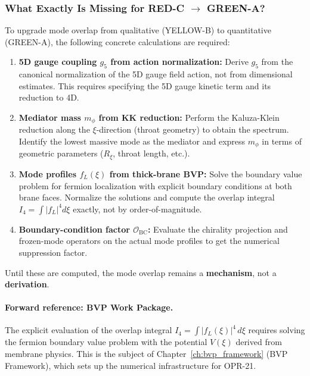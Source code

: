 \subsubsection{What Exactly Is Missing for RED-C $\to$ GREEN-A?}

To upgrade mode overlap from qualitative (YELLOW-B) to quantitative (GREEN-A),
the following concrete calculations are required:

\begin{enumerate}[nosep]
    \item \textbf{5D gauge coupling $g_5$ from action normalization:}
          Derive $g_5$ from the canonical normalization of the 5D gauge field
          action, not from dimensional estimates. This requires specifying the
          5D gauge kinetic term and its reduction to 4D.

    \item \textbf{Mediator mass $m_\phi$ from KK reduction:}
          Perform the Kaluza-Klein reduction along the $\xi$-direction (throat
          geometry) to obtain the spectrum. Identify the lowest massive mode
          as the mediator and express $m_\phi$ in terms of geometric parameters
          ($R_\xi$, throat length, etc.).

    \item \textbf{Mode profiles $f_L(\xi)$ from thick-brane BVP:}
          Solve the boundary value problem for fermion localization with
          explicit boundary conditions at both brane faces. Normalize the
          solutions and compute the overlap integral $I_4 = \int |f_L|^4 d\xi$
          exactly, not by order-of-magnitude.

    \item \textbf{Boundary-condition factor $\mathcal{O}_{\text{BC}}$:}
          Evaluate the chirality projection and frozen-mode operators on the
          actual mode profiles to get the numerical suppression factor.
\end{enumerate}

Until these are computed, the mode overlap remains a \textbf{mechanism}, not a
\textbf{derivation}.

\paragraph{Forward reference: BVP Work Package.}
The explicit evaluation of the overlap integral $I_4 = \int |f_L(\xi)|^4 \, d\xi$
requires solving the fermion boundary value problem with the potential $V(\xi)$
derived from membrane physics. This is the subject of Chapter~\ref{ch:bvp_framework}
(BVP Framework), which sets up the numerical infrastructure for OPR-21.

